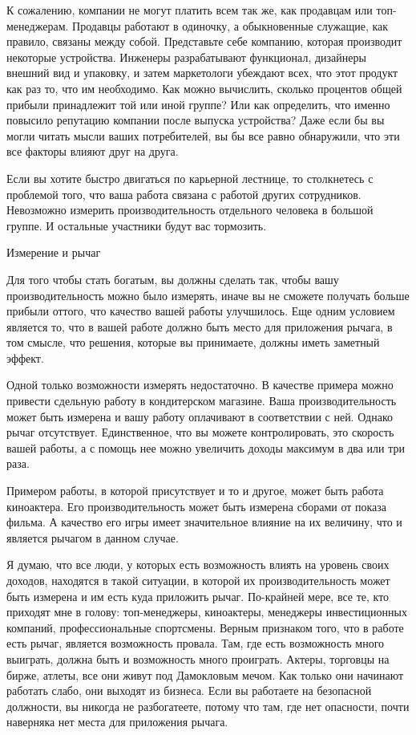 \documentclass[ebook,12pt,oneside,openany]{memoir}
\begin{document}
К сожалению, компании не могут платить всем так же, как продавцам или
топ-менеджерам. Продавцы работают в одиночку, а обыкновенные служащие,
как правило, связаны между собой. Представьте себе компанию, которая
производит некоторые устройства. Инженеры разрабатывают функционал,
дизайнеры внешний вид и упаковку, и затем маркетологи убеждают всех,
что этот продукт как раз то, что им необходимо. Как можно вычислить,
сколько процентов общей прибыли принадлежит той или иной группе? Или
как определить, что именно повысило репутацию компании после выпуска
устройства? Даже если бы вы могли читать мысли ваших потребителей, вы
бы все равно обнаружили, что эти все факторы влияют друг на друга.

Если вы хотите быстро двигаться по карьерной лестнице, то столкнетесь
с проблемой того, что ваша работа связана с работой других
сотрудников. Невозможно измерить производительность отдельного
человека в большой группе. И остальные участники будут вас тормозить.

Измерение и рычаг

Для того чтобы стать богатым, вы должны сделать так, чтобы вашу
производительность можно было измерять, иначе вы не сможете получать
больше прибыли оттого, что качество вашей работы улучшилось. Еще одним
условием является то, что в вашей работе должно быть место для
приложения рычага, в том смысле, что решения, которые вы принимаете,
должны иметь заметный эффект.

Одной только возможности измерять недостаточно. В качестве примера
можно привести сдельную работу в кондитерском магазине. Ваша
производительность может быть измерена и вашу работу оплачивают в
соответствии с ней. Однако рычаг отсутствует. Единственное, что вы
можете контролировать, это скорость вашей работы, а с помощь нее можно
увеличить доходы максимум в два или три раза.

Примером работы, в которой присутствует и то и другое, может быть
работа киноактера. Его производительность может быть измерена сборами
от показа фильма. А качество его игры имеет значительное влияние на их
величину, что и является рычагом в данном случае.

Я думаю, что все люди, у которых есть возможность влиять на уровень
своих доходов, находятся в такой ситуации, в которой их
производительность может быть измерена и им есть куда приложить рычаг.
По-крайней мере, все те, кто приходят мне в голову: топ-менеджеры,
киноактеры, менеджеры инвестиционных компаний, профессиональные
спортсмены. Верным признаком того, что в работе есть рычаг, является
возможность провала. Там, где есть возможность много выиграть, должна
быть и возможность много проиграть. Актеры, торговцы на бирже, атлеты,
все они живут под Дамокловым мечом. Как только они начинают работать
слабо, они выходят из бизнеса. Если вы работаете на безопасной
должности, вы никогда не разбогатеете, потому что там, где нет
опасности, почти наверняка нет места для приложения рычага.
\end{document}
